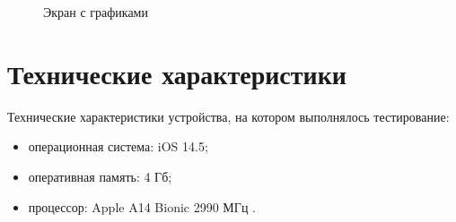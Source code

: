 \begin{figure}[h!]
	\caption{Экран с графиками}
	\label{fig:график}
\end{figure}

\section{Технические характеристики}


Технические характеристики устройства, на котором выполнялось тестирование:

\begin{itemize}
	\item операционная система: iOS 14.5;
	\item оперативная память: 4 Гб;
	\item процессор: Apple A14 Bionic 2990 МГц \cite{ipad}.
\end{itemize}

